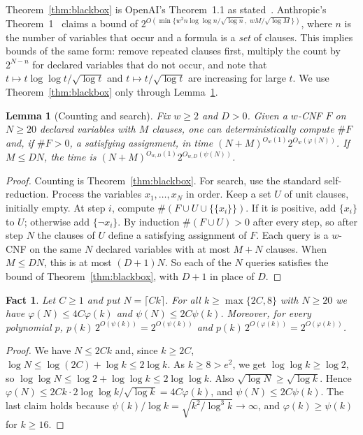 \documentclass[11pt]{amsart}
\newtheorem{lemma}[theorem]{Lemma}
\newtheorem{fact}[theorem]{Fact}
\theoremstyle{definition}
\theoremstyle{remark}
\begin{document}
Theorem~\ref{thm:blackbox} is OpenAI's Theorem~1.1 as stated~\cite{Ope26}. Anthropic's Theorem~1~\cite{Cla26} claims a bound of $2^{O(\min\{w^2 n\log\log n/\sqrt{\log n},\; wM/\sqrt{\log M}\})}$, where $n$ is the number of variables that occur and a formula is a \emph{set} of clauses. This implies bounds of the same form: remove repeated clauses first, multiply the count by $2^{N-n}$ for declared variables that do not occur, and note that $t\mapsto t\log\log t/\sqrt{\log t}$ and $t\mapsto t/\sqrt{\log t}$ are increasing for large $t$. We use Theorem~\ref{thm:blackbox} only through Lemma~\ref{lem:transfer}.

\begin{lemma}[Counting and search]\label{lem:transfer}
Fix $w\ge 2$ and $D>0$. Given a $w$-CNF $F$ on $N\ge 20$ declared variables with $M$ clauses, one can deterministically compute $\#F$ and, if $\#F>0$, a satisfying assignment, in time $(N+M)^{O_w(1)}2^{O_w(\varphi(N))}$. If $M\le DN$, the time is $(N+M)^{O_{w,D}(1)}2^{O_{w,D}(\psi(N))}$.
\end{lemma}

\begin{proof}
Counting is Theorem~\ref{thm:blackbox}. For search, use the standard self-reduction. Process the variables $x_1,\dots,x_N$ in order. Keep a set $U$ of unit clauses, initially empty. At step $i$, compute $\#(F\cup U\cup\{\{x_i\}\})$. If it is positive, add $\{x_i\}$ to $U$; otherwise add $\{\neg x_i\}$. By induction $\#(F\cup U)>0$ after every step, so after step $N$ the clauses of $U$ define a satisfying assignment of $F$. Each query is a $w$-CNF on the same $N$ declared variables with at most $M+N$ clauses. When $M\le DN$, this is at most $(D+1)N$. So each of the $N$ queries satisfies the bound of Theorem~\ref{thm:blackbox}, with $D+1$ in place of $D$.
\end{proof}

\begin{fact}\label{fact:rates}
Let $C\ge1$ and put $N=\lceil Ck\rceil$. For all $k\ge\max\{2C,8\}$ with $N\ge 20$ we have $\varphi(N)\le 4C\varphi(k)$ and $\psi(N)\le 2C\psi(k)$. Moreover, for every polynomial $p$, $p(k)\,2^{O(\psi(k))}=2^{O(\psi(k))}$ and $p(k)\,2^{O(\varphi(k))}=2^{O(\varphi(k))}$.
\end{fact}

\begin{proof}
We have $N\le 2Ck$ and, since $k\ge 2C$, $\log N\le\log(2C)+\log k\le 2\log k$. As $k\ge 8>e^2$, we get $\log\log k\ge\log 2$, so $\log\log N\le \log 2+\log\log k\le 2\log\log k$. Also $\sqrt{\log N}\ge\sqrt{\log k}$. Hence $\varphi(N)\le 2Ck\cdot 2\log\log k/\sqrt{\log k}=4C\varphi(k)$, and $\psi(N)\le 2C\psi(k)$. The last claim holds because $\psi(k)/\log k=\sqrt{k^2/\log^3 k}\to\infty$, and $\varphi(k)\ge\psi(k)$ for $k\ge 16$.
\end{proof}
\end{document}
